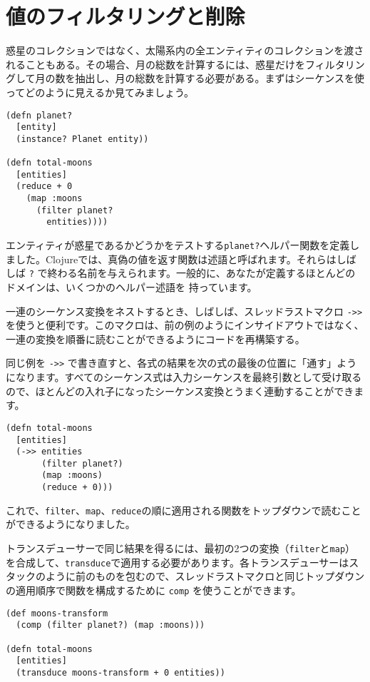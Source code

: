 \section{値のフィルタリングと削除}

惑星のコレクションではなく、太陽系内の全エンティティのコレクションを渡されることもある。その場合、月の総数を計算するには、惑星だけをフィルタリングして月の数を抽出し、月の総数を計算する必要がある。まずはシーケンスを使ってどのように見えるか見てみましょう。


\begin{lstlisting}[numbers=none]
(defn planet?
  [entity]
  (instance? Planet entity))

(defn total-moons
  [entities]
  (reduce + 0
    (map :moons
      (filter planet?
        entities))))
\end{lstlisting}


エンティティが惑星であるかどうかをテストする\texttt{planet?}ヘルパー関数を定義しました。Clojureでは、真偽の値を返す関数は述語と呼ばれます。それらはしばしば \texttt{?} で終わる名前を与えられます。一般的に、あなたが定義するほとんどのドメインは、いくつかのヘルパー述語を 持っています。

一連のシーケンス変換をネストするとき、しばしば、スレッドラストマクロ \texttt{->>} を使うと便利です。このマクロは、前の例のようにインサイドアウトではなく、一連の変換を順番に読むことができるようにコードを再構築する。

同じ例を \texttt{->>} で書き直すと、各式の結果を次の式の最後の位置に「通す」ようになります。すべてのシーケンス式は入力シーケンスを最終引数として受け取るので、ほとんどの入れ子になったシーケンス変換とうまく連動することができます。


\begin{lstlisting}[numbers=none]
(defn total-moons
  [entities]
  (->> entities
       (filter planet?)
       (map :moons)
       (reduce + 0)))
\end{lstlisting}

これで、\texttt{filter}、\texttt{map}、\texttt{reduce}の順に適用される関数をトップダウンで読むことができるようになりました。

トランスデューサーで同じ結果を得るには、最初の2つの変換（\texttt{filter}と\texttt{map}）を合成して、\texttt{transduce}で適用する必要があります。各トランスデューサーはスタックのように前のものを包むので、スレッドラストマクロと同じトップダウンの適用順序で関数を構成するために \texttt{comp} を使うことができます。

\begin{lstlisting}[numbers=none]
(def moons-transform
  (comp (filter planet?) (map :moons)))

(defn total-moons
  [entities]
  (transduce moons-transform + 0 entities))
\end{lstlisting}

